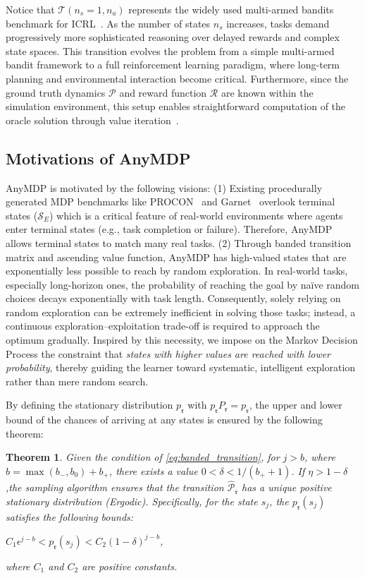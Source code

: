 \documentclass{article}
\newtheorem{theorem}{Theorem}
\begin{document}
Notice that $\mathcal{T}(n_s=1, n_a)$ represents the widely used multi-armed bandits benchmark for ICRL~\citep{duan2016rl,lee2024supervised,mishra2018simple}. As the number of states $n_s$ increases, tasks demand progressively more sophisticated reasoning over delayed rewards and complex state spaces. This transition evolves the problem from a simple multi-armed bandit framework to a full reinforcement learning paradigm, where long-term planning and environmental interaction become critical. Furthermore, since the ground truth dynamics $\mathcal{P}$ and reward function $\mathcal{R}$ are known within the simulation environment, this setup enables straightforward computation of the oracle solution through value iteration~\citep{bellman1958dynamic}. 

\subsection{Motivations of AnyMDP}

AnyMDP is motivated by the following visions: (1) Existing procedurally generated MDP benchmarks like PROCON~\citep{archibald1995generation} and Garnet~\citep{bhatnagar2009natural} overlook terminal states ($\mathcal{S}_E$) which is a critical feature of real-world environments where agents enter terminal states (e.g., task completion or failure). Therefore, AnyMDP allows terminal states to match many real tasks.
(2) Through banded transition matrix and ascending value function, AnyMDP has high-valued states that are exponentially less possible to reach by random exploration. In real-world tasks, especially long-horizon ones, the probability of reaching the goal by naïve random choices decays exponentially with task length. Consequently, solely relying on random exploration can be extremely inefficient in solving those tasks; instead, a continuous exploration–exploitation trade-off is required to approach the optimum gradually. Inspired by this necessity, we impose on the Markov Decision Process the constraint that \emph{states with higher values are reached with lower probability}, thereby guiding the learner toward systematic, intelligent exploration rather than mere random search.

By defining the stationary distribution $p_{\mathfrak{r}}$ with $p_{\mathfrak{r}} P_{\mathfrak{r}} = p_{\mathfrak{r}}$, the upper and lower bound of the chances of arriving at any states is ensured by the following theorem:
\begin{theorem}
Given the condition of \cref{eq:banded_transition}, for $j > b$, where $b=\max(b_{-}, b_0) + b_{+}$, there exists a value $0 < \delta < 1/(b_{+}+1)$. If $\eta > 1-\delta$,the sampling algorithm ensures that the transition $\hat{\mathcal{P}}_{\mathfrak{r}}$ has a unique positive stationary distribution (Ergodic). Specifically, for the state $s_j$, the $p_\mathfrak{r}(s_j)$ satisfies the following bounds:
\begin{center}
$C_1\epsilon^{j-b}< p_\mathfrak{r}(s_j) < C_2(1-\delta)^{j-b}$,
\end{center}
where $C_1$ and $C_2$ are positive constants.
\label{theory:mc}
\end{theorem}
\end{document}
